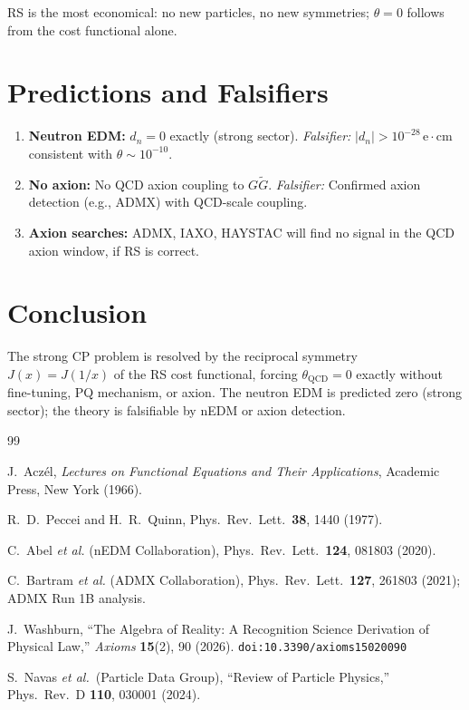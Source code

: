 \documentclass[12pt,a4paper]{article}
\theoremstyle{definition}
\theoremstyle{remark}
\begin{document}
RS is the most economical: no new particles, no new symmetries;
$\theta = 0$ follows from the cost functional alone.

\section{Predictions and Falsifiers}
\label{sec:falsifiers}

\begin{enumerate}[label=(\roman*)]
\item \textbf{Neutron EDM:} $d_n = 0$ exactly (strong sector).
  \textit{Falsifier:} $|d_n| > 10^{-28}\,\mathrm{e}\cdot\mathrm{cm}$
  consistent with $\theta \sim 10^{-10}$.

\item \textbf{No axion:} No QCD axion coupling to $G\tilde{G}$.
  \textit{Falsifier:} Confirmed axion detection (e.g., ADMX) with
  QCD-scale coupling.

\item \textbf{Axion searches:} ADMX, IAXO, HAYSTAC will find no
  signal in the QCD axion window, if RS is correct.
\end{enumerate}

\section{Conclusion}
\label{sec:conclusion}

The strong CP problem is resolved by the reciprocal symmetry
$J(x) = J(1/x)$ of the RS cost functional, forcing
$\theta_{\mathrm{QCD}} = 0$ exactly without fine-tuning, PQ mechanism,
or axion.  The neutron EDM is predicted zero (strong sector); the
theory is falsifiable by nEDM or axion detection.

\begin{thebibliography}{99}

J.~Acz\'el, \emph{Lectures on Functional Equations and Their Applications},
Academic Press, New York (1966).

R.~D.~Peccei and H.~R.~Quinn, Phys.\ Rev.\ Lett.\ \textbf{38}, 1440 (1977).

C.~Abel \textit{et al.} (nEDM Collaboration), Phys.\ Rev.\ Lett.\
\textbf{124}, 081803 (2020).

C.~Bartram \textit{et al.} (ADMX Collaboration), Phys.\ Rev.\ Lett.\
\textbf{127}, 261803 (2021); ADMX Run 1B analysis.

J.~Washburn, ``The Algebra of Reality: A Recognition Science Derivation
of Physical Law,'' \emph{Axioms} \textbf{15}(2), 90 (2026).
\texttt{doi:10.3390/axioms15020090}

S.~Navas \textit{et al.}\ (Particle Data Group),
``Review of Particle Physics,'' Phys.\ Rev.\ D \textbf{110}, 030001
(2024).

\end{thebibliography}
\end{document}
